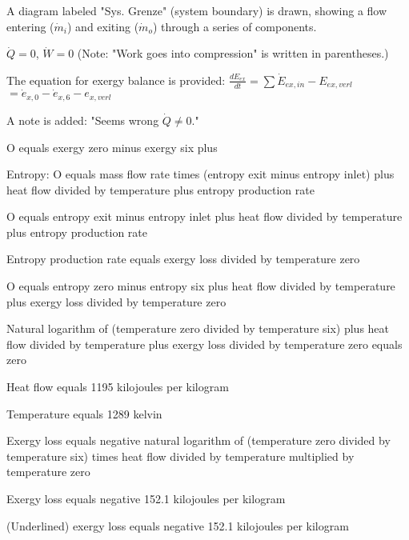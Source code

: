 A diagram labeled "Sys. Grenze" (system boundary) is drawn, showing a flow entering (\( \dot{m}_i \)) and exiting (\( \dot{m}_o \)) through a series of components.  

\( \dot{Q} = 0 \), \( \dot{W} = 0 \)  
(Note: "Work goes into compression" is written in parentheses.)  

The equation for exergy balance is provided:  
\( \frac{dE_{ex}}{dt} = \sum \dot{E}_{ex,in} - E_{ex,verl} \)  
\( = \dot{e}_{x,0} - \dot{e}_{x,6} - e_{x,verl} \)  

A note is added: "Seems wrong \( \dot{Q} \neq 0 \)."

O equals exergy zero minus exergy six plus  

Entropy: O equals mass flow rate times (entropy exit minus entropy inlet) plus heat flow divided by temperature plus entropy production rate  

O equals entropy exit minus entropy inlet plus heat flow divided by temperature plus entropy production rate  

Entropy production rate equals exergy loss divided by temperature zero  

O equals entropy zero minus entropy six plus heat flow divided by temperature plus exergy loss divided by temperature zero  

Natural logarithm of (temperature zero divided by temperature six) plus heat flow divided by temperature plus exergy loss divided by temperature zero equals zero  

Heat flow equals 1195 kilojoules per kilogram  

Temperature equals 1289 kelvin  

Exergy loss equals negative natural logarithm of (temperature zero divided by temperature six) times heat flow divided by temperature multiplied by temperature zero  

Exergy loss equals negative 152.1 kilojoules per kilogram  

(Underlined) exergy loss equals negative 152.1 kilojoules per kilogram